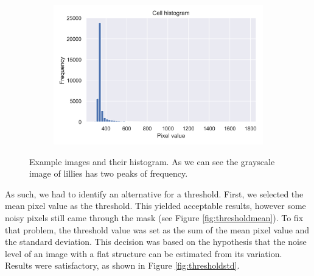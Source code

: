 \begin{figure}[h]
\begin{subfigure}{0.45\textwidth}
    \end{subfigure}
    \begin{subfigure}{0.5\textwidth}
        \centering
        \includegraphics[width=.45\textwidth]{dissertation/figures/cell_histogram.png}
    \end{subfigure}
    \caption{Example images and their histogram. As we can see the grayscale image of lillies has two peaks of frequency.}
    \label{fig:thresholdhist}
\end{figure}
As such, we had to identify an alternative for a threshold. First, we selected the mean pixel value as the threshold. This yielded acceptable results, however some noisy pixels still came through the mask (see Figure \ref{fig:thresholdmean}). To fix that problem, the threshold value was set as the sum of the mean pixel value and the standard deviation. This decision was based on the hypothesis that the noise level of an image with a flat structure can be estimated from its variation. Results were satisfactory, as shown in Figure \ref{fig:thresholdstd}.

